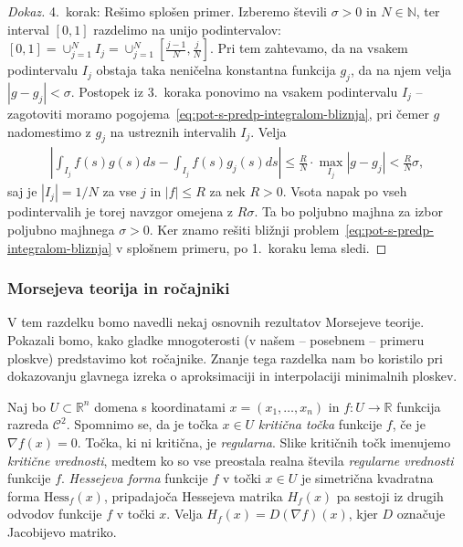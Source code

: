\documentclass[12pt,a4paper,twoside]{article}
\theoremstyle{definition} %
\newenvironment{dokaz}[1][Dokaz]{\begin{proof}[#1]}{\end{proof}}
\theoremstyle{plain} %
\numberwithin{equation}{section}  %
\begin{document}
\begin{dokaz}
4.~korak: Rešimo splošen primer. \newline
Izberemo števili $\sigma > 0$ in $N \in \mathbb{N}$, ter interval $[0,1]$ razdelimo na unijo podintervalov: $[0,1] = \cup_{j=1}^{N} I_{j} = \cup_{j=1}^{N} [\frac{j-1}{N}, \frac{j}{N}]$. Pri tem zahtevamo, da na vsakem podintervalu $I_{j}$ obstaja taka neničelna konstantna funkcija $g_{j}$, da na njem velja $|g - g_{j}| < \sigma$.
Postopek iz 3.~koraka ponovimo na vsakem podintervalu $I_{j}$ -- zagotoviti moramo pogojema~\eqref{eq:pot-s-predp-integralom-bliznja}, pri čemer $g$ nadomestimo z $g_{j}$ na ustreznih intervalih $I_{j}$.
Velja
\begin{gather*}
\left| \int_{I_{j}} f(s)g(s)ds - \int_{I_{j}} f(s)g_{j}(s)ds \right| \leq \frac{R}{N} \cdot \max_{I_{j}} |g - g_{j}| < \frac{R}{N} \sigma,
\end{gather*}
saj je $|I_{j}| = 1/N$ za vse $j$ in $|f| \leq R$ za nek $R > 0$.
Vsota napak po vseh podintervalih je torej navzgor omejena z $R \sigma$. Ta bo poljubno majhna za izbor poljubno majhnega $\sigma >0$.
Ker znamo rešiti bližnji problem~\eqref{eq:pot-s-predp-integralom-bliznja} v splošnem primeru, po 1.~koraku lema sledi.
\end{dokaz}

\subsubsection{Morsejeva teorija in ročajniki}
%
V tem razdelku bomo navedli nekaj osnovnih rezultatov Morsejeve teorije. Pokazali bomo, kako gladke mnogoterosti (v našem -- posebnem -- primeru ploskve) predstavimo kot ročajnike. Znanje tega razdelka nam bo koristilo pri dokazovanju glavnega izreka o aproksimaciji in interpolaciji minimalnih ploskev.
   
Naj bo $U \subset \mathbb{R}^{n}$ domena s koordinatami $x = (x_{1}, \dots , x_{n})$ in $f \colon U \to \mathbb{R}$ funkcija razreda $\mathcal{C}^{2}$.
Spomnimo se, da je točka $x \in U$ \emph{kritična točka} funkcije $f$, če je $\nabla f(x) = 0$. Točka, ki ni kritična, je \emph{regularna}.
Slike kritičnih točk imenujemo \emph{kritične vrednosti}, medtem ko so vse preostala realna števila \emph{regularne vrednosti} funkcije $f$. \newline
%
\emph{Hessejeva forma} funkcije $f$ v točki $x \in U$ je simetrična kvadratna forma $\text{Hess}_{f}(x)$, pripadajoča Hessejeva matrika $H_{f}(x)$ pa sestoji iz drugih odvodov funkcije $f$ v točki $x$. Velja $H_{f}(x) = D(\nabla f)(x)$, kjer $D$ označuje Jacobijevo matriko.
\end{document}
